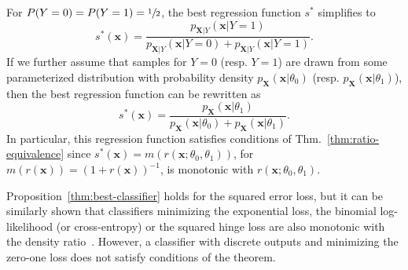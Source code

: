 \documentclass[12pt]{article}
\numberwithin{equation}{section}
\theoremstyle{plain}
\begin{document}
For $P(Y=0)=P(Y=1)=\sfrac{1}{2}$, the best regression function $s^*$ simplifies
to
\begin{equation}
s^*(\mathbf{x}) = \frac{p_{\mathbf{X}|Y}(\mathbf{x}|Y=1)}{p_{\mathbf{X}|Y}(\mathbf{x} | Y=0) + p_{\mathbf{X}|Y}(\mathbf{x} | Y=1)}.
\end{equation}
If we further assume that samples for $Y=0$ (resp. $Y=1$) are drawn from some parameterized
distribution with probability density $p_{\mathbf{X}}(\mathbf{x}|\theta_0)$ (resp. $p_{\mathbf{X}}(\mathbf{x}|\theta_1)$), then the best regression function can be rewritten
as
\begin{equation}
s^*(\mathbf{x}) = \frac{p_{\mathbf{X}}(\mathbf{x}|\theta_1)}{p_{\mathbf{X}}(\mathbf{x} | \theta_0) + p_{\mathbf{X}}(\mathbf{x} | \theta_1)}.
\end{equation}
In particular, this regression function satisfies conditions of
Thm.~\ref{thm:ratio-equivalence} since $s^*(\mathbf{x}) =
m(r(\mathbf{x}; \theta_0, \theta_1))$,
for $m(r(\mathbf{x})) = ({1 + r(\mathbf{x})})^{-1}$, is monotonic with
$r(\mathbf{x}; \theta_0, \theta_1)$.

Proposition~\ref{thm:best-classifier} holds for the squared error loss, but it
can be similarly shown that classifiers minimizing the exponential loss, the
binomial log-likelihood (or cross-entropy) or the squared hinge loss are also
monotonic with the density ratio~\citep{friedman2000additive,lin2002support}.
However, a classifier with discrete outputs and minimizing the zero-one loss
does not satisfy conditions of the theorem.
\end{document}
